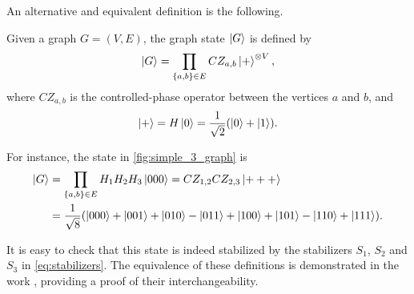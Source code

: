 An alternative and equivalent definition is the following.

Given a graph $G = (V, E)$, the graph state $\ket{G}$ is defined by
\begin{equation}
    \ket{G} = \prod_{\substack{\{ a, b \} \in E}} 
    CZ_{a, b} \ket{+}^{\otimes V} ,
\end{equation}
where $CZ_{a, b}$ is the controlled-phase operator between the vertices $a$ and $b$, and 
\begin{equation}
    \ket{+} = H \ket{0} = \frac{1}{\sqrt{2}} (\ket{0} + \ket{1}) .
\end{equation}

For instance, the state in \cref{fig:simple_3_graph} is
\begin{align}
    \ket{G} &=
    \prod_{\substack{\{ a, b \} \in E}} H_1 H_2 H_3 \ket{000} =
    CZ_{1, 2} CZ_{2, 3} \ket{+++} \\
    &= \frac{1}{\sqrt{8}} 
    (\ket{000} + \ket{001} + \ket{010} - \ket{011} 
    + \ket{100} + \ket{101} - \ket{110} + \ket{111}) . \notag
\end{align}

It is easy to check that this state is indeed stabilized by the stabilizers $S_1$, $S_2$ and $S_3$ in \cref{eq:stabilizers}.
The equivalence of these definitions is demonstrated in the work \cite{graph_state}, providing a proof of their interchangeability.
